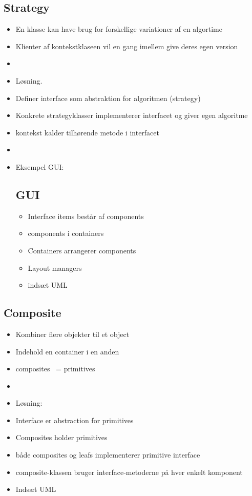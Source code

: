 \subsection{Strategy} %
\label{sub:strategy}
\begin{itemize}
    \item En klasse kan have brug for forskellige variationer af en algortime
    \item Klienter af kontekstklaseen vil en gang imellem give deres egen version
    \item
    \item Løsning.
    \item Definer interface som abstraktion for algoritmen (strategy)
    \item Konkrete strategyklasser implementerer interfacet og giver egen algoritme
    \item kontekst kalder tilhørende metode i interfacet
    \item
    \item Eksempel GUI:
\subsection{GUI} %
\label{sub:gui}
\begin{itemize}
    \item Interface items består af components
    \item components i containers
    \item Containers arrangerer components
    \item Layout managers
    \item indsæt UML
\end{itemize}
\end{itemize}

\subsection{Composite} %
\label{sub:composite}
\begin{itemize}
    \item Kombiner flere objekter til et object
    \item Indehold en container i en anden
    \item composites ~= primitives
    \item
    \item Løsning:
    \item Interface er abstraction for primitives
    \item Composites holder primitives
    \item både composites og leafs implementerer primitive interface
    \item composite-klassen bruger interface-metoderne på hver enkelt komponent
    \item Indsæt UML
\end{itemize}

